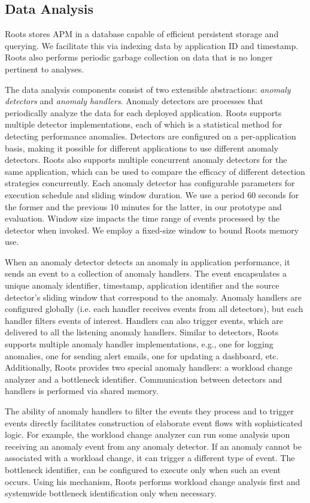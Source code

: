 \subsection{Data Analysis}

Roots stores APM in a database capable of 
efficient persistent storage
and querying. We facilitate this via indexing
data by application ID and timestamp.
Roots also performs periodic garbage collection on data that is no longer
pertinent to analyses.

The data analysis components consist of two extensible
abstractions: \textit{anomaly detectors} 
and \textit{anomaly handlers}.
Anomaly detectors are processes that periodically 
analyze the data for
each deployed application. 
Roots supports multiple detector implementations, 
each of which is a statistical method for detecting 
performance anomalies. Detectors are configured
on a per-application basis, making it possible for different applications to use different anomaly 
detectors. Roots also supports multiple concurrent anomaly detectors for 
the same application, which can be used
to compare the efficacy of different detection strategies concurrently.
Each anomaly detector has configurable parameters for execution schedule 
and sliding window duration.
We use a period 60 seconds for the former and the previous
10 minutes for the latter, in our prototype and evaluation.
Window size impacts the time range of events processed
by the detector when invoked.
We employ a fixed-size window to bound Roots memory use.

When an anomaly detector detects an anomaly 
in application performance, it sends an event
to a collection of anomaly handlers. 
The event encapsulates a unique anomaly identifier, 
timestamp, application identifier and the source detector's sliding window that correspond to the
anomaly. Anomaly handlers are configured globally (i.e. each handler
receives events from all detectors), but each handler filters events
of interest.
Handlers can also trigger events, which are delivered to
all the listening anomaly handlers. Similar to detectors, 
Roots supports multiple anomaly handler
implementations, e.g., one for logging anomalies, one for sending alert emails, one
for updating a dashboard, etc. 
Additionally, Roots provides two special anomaly handlers:
a workload change analyzer and a bottleneck identifier.
Communication between detectors and handlers 
is performed via shared memory.

The ability of anomaly handlers to filter the events they 
process and to trigger events directly
facilitates construction of 
elaborate event flows with sophisticated logic. For example, the workload
change analyzer can run some analysis upon receiving an anomaly event
from any anomaly detector. If an anomaly cannot be associated 
with a workload
change, it can trigger a different type of event. 
The bottleneck identifier, can
be configured to execute only when such an event occurs.
Using his mechanism, Roots performs workload change analysis first
and systemwide bottleneck identification only when necessary.

